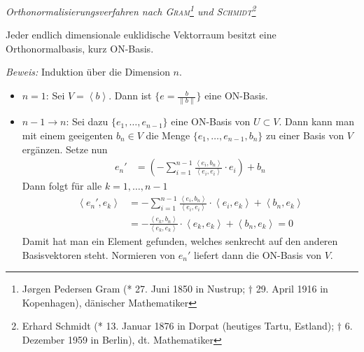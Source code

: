 \begin{mysatz} \textit{Orthonormalisierungsverfahren nach 
    \textsc{Gram}\footnote{J\o rgen Pedersen Gram (* 27. Juni 1850 in Nustrup; $\dagger$ 29. April 1916 in Kopenhagen), dänischer Mathematiker}
    und
    \textsc{Schmidt}\footnote{Erhard Schmidt (* 13. Januar 1876 in Dorpat (heutiges Tartu, Estland); $\dagger$ 6. Dezember 1959 in Berlin), dt. Mathematiker}}

    Jeder endlich dimensionale euklidische Vektorraum besitzt eine Orthonormalbasis, kurz ON-Basis.

    \textit{Beweis:} Induktion über die Dimension $n$.

    \begin{itemize}
        \item $n = 1$: Sei $V=\left\langle b \right\rangle$. Dann ist $\{ e=\frac{b}{\| b \|}\}$ eine ON-Basis.\par \medskip
        \item $n - 1 \rightarrow n$: Sei dazu $\{ e_1, \ldots, e_{n-1} \}$ eine ON-Basis von $U \subset V$.
            Dann kann man mit einem geeigenten $b_n\in V$ die Menge $\{ e_1, \ldots, e_{n-1}, b_n \}$ zu einer Basis von $V$ ergänzen.
            Setze nun
            \begin{align*}
                e_n' & = \left( - \sum\limits_{i = 1}^{n-1} \frac{ \left\langle e_i, b_n \right\rangle }{ \left\langle e_i, e_i \right\rangle } \cdot e_i \right) + b_n
            \end{align*}
            Dann folgt für alle $k = 1, \ldots, n-1$
            \begin{align*}
                \left\langle e_n', e_k \right\rangle & = - \sum_{i = 1}^{n-1} \frac{ \left\langle e_i, b_n \right\rangle }{ \left\langle e_i,e_i \right\rangle } \cdot 
                \left\langle e_i,e_k \right\rangle + \left\langle b_n,e_k \right\rangle \\
                & = - \frac{ \left\langle e_k,b_n \right\rangle }{ \left\langle e_k,e_k \right\rangle } \cdot \left\langle e_k,e_k \right\rangle + \left\langle b_n,e_k \right\rangle = 0
            \end{align*}
            Damit hat man ein Element gefunden, welches senkrecht auf den anderen Basisvektoren steht. Normieren von $e_n'$ liefert dann die ON-Basis von $V$.
    \end{itemize}
\end{mysatz}


